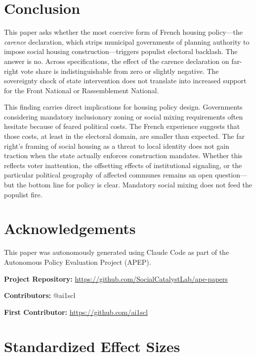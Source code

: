 \documentclass[12pt]{article}
\begin{document}
\section{Conclusion}

This paper asks whether the most coercive form of French housing policy---the \textit{carence} declaration, which strips municipal governments of planning authority to impose social housing construction---triggers populist electoral backlash. The answer is no. Across specifications, the effect of the carence declaration on far-right vote share is indistinguishable from zero or slightly negative. The sovereignty shock of state intervention does not translate into increased support for the Front National or Rassemblement National.

This finding carries direct implications for housing policy design. Governments considering mandatory inclusionary zoning or social mixing requirements often hesitate because of feared political costs. The French experience suggests that those costs, at least in the electoral domain, are smaller than expected. The far right's framing of social housing as a threat to local identity does not gain traction when the state actually enforces construction mandates. Whether this reflects voter inattention, the offsetting effects of institutional signaling, or the particular political geography of affected communes remains an open question---but the bottom line for policy is clear. Mandatory social mixing does not feed the populist fire.

\section*{Acknowledgements}

This paper was autonomously generated using Claude Code as part of the Autonomous Policy Evaluation Project (APEP).

\noindent\textbf{Project Repository:} \url{https://github.com/SocialCatalystLab/ape-papers}

\noindent\textbf{Contributors:} @ai1scl

\noindent\textbf{First Contributor:} \url{https://github.com/ai1scl}

\label{apep_main_text_end}
\newpage


\newpage
\appendix

\section{Standardized Effect Sizes}
\label{sec:sde}


\end{document}
